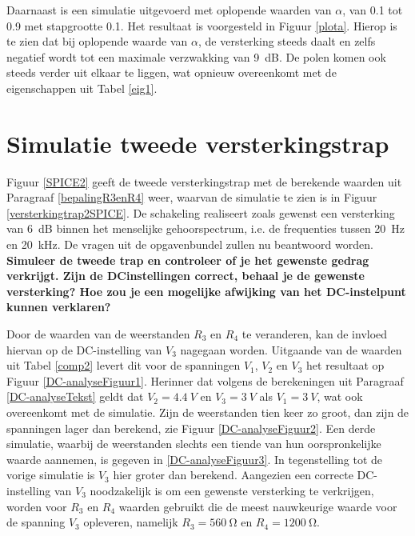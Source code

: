 \documentclass{report}
\begin{document}
Daarnaast is een simulatie uitgevoerd met oplopende waarden van $\alpha$, van 0.1 tot 0.9 met stapgrootte 0.1. Het resultaat is voorgesteld in Figuur \ref{plota}. Hierop is te zien dat bij oplopende waarde van $\alpha$, de versterking steeds daalt en zelfs negatief wordt tot een maximale verzwakking van \SI{9}{\deci\bel}. De polen komen ook steeds verder uit elkaar te liggen, wat opnieuw overeenkomt met de eigenschappen uit Tabel \ref{eig1}.

\section{Simulatie tweede versterkingstrap}

Figuur \ref{SPICE2} geeft de tweede versterkingstrap met de berekende waarden uit Paragraaf \ref{bepalingR3enR4} weer, waarvan de simulatie te zien is in Figuur \ref{versterkingtrap2SPICE}. De schakeling realiseert zoals gewenst een versterking van \SI{6}{\deci\bel} binnen het menselijke gehoorspectrum, i.e. de frequenties tussen \SI{20}{\hertz} en \SI{20}{\kilo\hertz}. De vragen uit de opgavenbundel zullen nu beantwoord worden.\\

\noindent \textbf{Simuleer de tweede trap en controleer of je het gewenste gedrag verkrijgt. Zijn de DCinstellingen correct, behaal je de gewenste versterking? Hoe zou je een mogelijke afwijking van het DC-instelpunt kunnen verklaren?}


\noindent Door de waarden van de weerstanden $R_3$ en $R_4$ te veranderen, kan de invloed hiervan op de DC-instelling van $V_3$ nagegaan worden. Uitgaande van de waarden uit Tabel \ref{comp2} levert dit voor de spanningen $V_1$, $V_2$ en $V_3$ het resultaat op Figuur \ref{DC-analyseFiguur1}. Herinner dat volgens de berekeningen uit Paragraaf \ref{DC-analyseTekst} geldt dat $V_2=\SI{4.4}{V}$ en $V_3=\SI{3}{V}$ als $V_1=\SI{3}{V}$, wat ook overeenkomt met de simulatie. Zijn de weerstanden tien keer zo groot, dan zijn de spanningen lager dan berekend, zie Figuur \ref{DC-analyseFiguur2}. Een derde simulatie, waarbij de weerstanden slechts een tiende van hun oorspronkelijke waarde aannemen, is gegeven in \ref{DC-analyseFiguur3}. In tegenstelling tot de vorige simulatie is $V_3$ hier groter dan berekend. Aangezien een correcte DC-instelling van $V_3$ noodzakelijk is om een gewenste versterking te verkrijgen, worden voor $R_3$ en $R_4$ waarden gebruikt die de meest nauwkeurige waarde voor de spanning $V_3$ opleveren, namelijk $R_3 = \SI{560}{\ohm}$ en $R_4 = \SI{1200}{\ohm}$.\\
\end{document}
